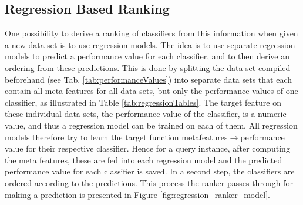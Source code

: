 \subsection{Regression Based Ranking}
One possibility to derive a ranking of classifiers from this information when given a new data set is to use regression models. The idea is to use separate regression models to predict a performance value for each classifier, and to then derive an ordering from these predictions. This is done by splitting the data set compiled beforehand (see Tab. \ref{tab:performanceValues}) into separate data sets that each contain all meta features for all data sets, but only the performance values of one classifier, as illustrated in Table \ref{tab:regressionTables}. The target feature on these individual data sets, the performance value of the classifier, is a numeric value, and thus a regression model can be trained on each of them. All regression models therefore try to learn the target function metafeatures$\rightarrow$performance value for their respective classifier. Hence for a query instance, after computing the meta features, these are fed into each regression model and the predicted performance value for each classifier is saved. In a second step, the classifiers are ordered according to the predictions. This process the ranker passes through for making a prediction is presented in Figure \ref{fig:regression_ranker_model}.

